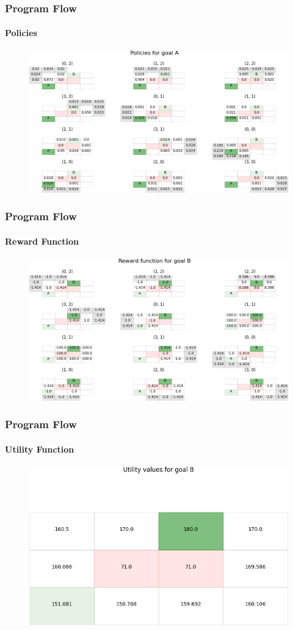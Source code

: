 \documentclass[11pt]{beamer}
\begin{document}
\begin{frame}
	\frametitle{Program Flow}
	\framesubtitle{Policies}
	\begin{figure}
		\centering
		\includegraphics[width=\linewidth]{res/A_policies}
	\end{figure}
	
\end{frame}

\begin{frame}
	\frametitle{Program Flow}
	\framesubtitle{Reward Function}
	\begin{figure}
		\centering
		\includegraphics[width=\linewidth]{res/B_reward}
	\end{figure}
\end{frame}

\begin{frame}
	\frametitle{Program Flow}
	\framesubtitle{Utility Function}
	\begin{figure}
		\centering
		\includegraphics[width=\linewidth]{res/B_utilities}
	\end{figure}
\end{frame}
\end{document}

